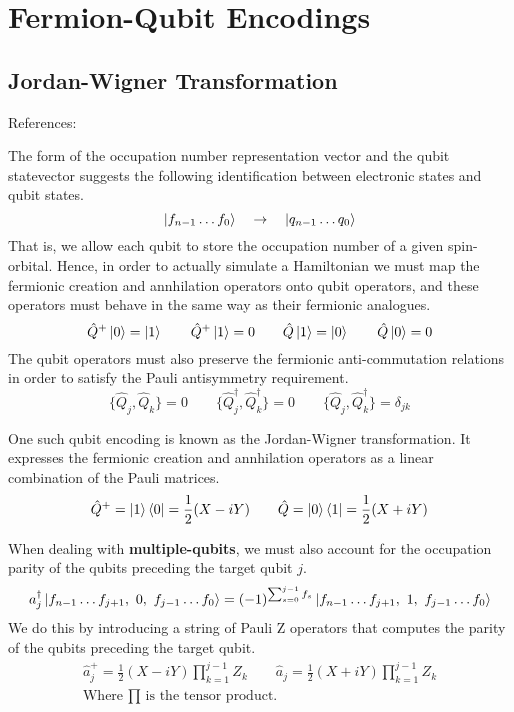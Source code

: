 \section{Fermion-Qubit Encodings}

\subsection{\label{fermion-qubit-encodings}Jordan-Wigner Transformation}
References: \cite{Seeley2020}

The form of the occupation number representation vector and the qubit statevector suggests the following identification between electronic states and qubit states.
\begin{equation*}
    \ket{f_{n-1} \dots f_{0}} \quad\rightarrow\quad \ket{q_{n-1} \dots q_{0}}
\end{equation*}
That is, we allow each qubit to store the occupation number of a given spin-orbital. Hence, in order to actually simulate a Hamiltonian we must map the fermionic creation and annhilation operators onto qubit operators, and these operators must behave in the same way as their fermionic analogues.
\begin{equation*}
    \hat Q^+ \ket 0 = \ket 1 \qquad
    \hat Q^+ \ket 1 = 0 \qquad
    \hat Q \ket 1 = \ket 0 \qquad
    \hat Q \ket 0 = 0
\end{equation*}
The qubit operators must also preserve the fermionic anti-commutation relations in order to satisfy the Pauli antisymmetry requirement.
\begin{equation*}
    \{ \hat Q_{j}, \hat Q_{k} \} = 0 \qquad
    \{ \hat Q_{j}^{\dagger}, \hat Q_{k}^{\dagger} \} = 0 \qquad
    \{ \hat Q_{j}, \hat Q_{k}^{\dagger} \} = \delta_{jk}
\end{equation*}

One such qubit encoding is known as the Jordan-Wigner transformation. It expresses the fermionic creation and annhilation operators as a linear combination of the Pauli matrices.
\begin{equation*}
    \hat Q^+ = \ket 1 \bra 0 = \frac{1}{2} (X - iY) \qquad \hat Q = \ket 0 \bra 1 = \frac{1}{2} (X + iY) 
\end{equation*}

When dealing with \textbf{multiple-qubits}, we must also account for the occupation parity of the qubits preceding the target qubit $j$.
\begin{equation*}
    a_j^\dagger \ket{f_{n-1} \dots f_{j+1},\,\, 0,\,\, f_{j-1} \dots f_0} = (-1)^{\sum_{s=0}^{j-1} f_s} \ket{f_{n-1} \dots f_{j+1},\,\, 1,\,\, f_{j-1} \dots f_0}
\end{equation*}
We do this by introducing a string of Pauli Z operators that computes the parity of the qubits preceding the target qubit.
\begin{equation*}
\begin{gathered}
    \hat a_j^+ = \frac{1}{2} (X - iY) \prod_{k=1}^{j-1} Z_k \qquad
    \hat a_j = \frac{1}{2} (X + iY) \prod_{k=1}^{j-1} Z_k \\[2ex]
    \text{Where $\prod$ is the tensor product.}
\end{gathered}
\end{equation*}

